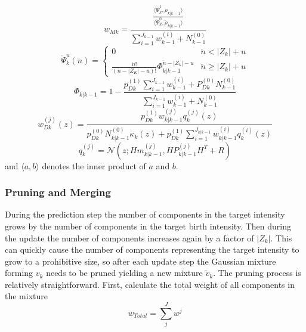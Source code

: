 \documentclass{article}
\begin{document}
\begin{equation}
  \label{eq:wmk}
  w_{Mk} = \frac{\frac{\langle\ddot{\Psi}_k^1,\ddot{\rho}_{k|k-1}\rangle}{\langle\ddot{\Psi}_k^0,\ddot{\rho}_{k|k-1}\rangle}}{\sum_{i=1}^{J_{k-1}}w_{k-1}^{(i)} + N_{k-1}^{(0)}}
\end{equation}
\begin{equation}
  \label{eq:psi}
  \ddot{\Psi}_k^u(\ddot{n}) =
  \begin{cases}
    0 & \ddot{n} < |Z_k| + u \\
   \frac{\ddot{n}!}{(\ddot{n}-|Z_K|-u)!}\Phi_{k|k-1}^{\ddot{n} - |Z_k|-u} & \ddot{n} \ge |Z_k|+u
  \end{cases}
\end{equation}
\begin{equation}
  \label{eq:Phi}
  \Phi_{k|k-1} = 1 - \frac{p_{Dk}^{(1)}\sum_{i=1}^{J_{k-1}}w_{k-1}^{(i)} + P_{Dk}^{(0)}N_{k-1}^{(0)}}{\sum_{i=1}^{J_{k-1}}w_{k-1}^{(i)} + N_{k-1}^{(0)}}
\end{equation}
\begin{equation}
  \label{eq:wD}
  w_{Dk}^{(j)}(z) = \frac{p_{Dk}^{(1)}w_{k|k-1}^{(j)}q_k^{(j)}(z)}{p_{Dk}^{(0)}N_{k|k-1}^{(0)}\kappa_k(z) +  p_{Dk}^{(1)}\sum_{i=1}^{J_{k|k-1}}w_{k|k-1}^{(i)}q_k^{(i)}(z)  }
\end{equation}
\begin{equation}
  \label{eq:qz}
  q_k^{(j)} = \mathcal{N}(z;Hm_{k|k-1}^{(j)}, HP_{k|k-1}^{(j)}H^T + R)
\end{equation}
and $\langle a, b \rangle$ denotes the inner product of $a$ and $b$.

\subsubsection*{Pruning and Merging}
During the prediction step the number of components in the target intensity grows by the number of components in the target birth intensity. Then during the update the number of components increases again by a factor of $|Z_k|$. This can quickly cause the number of components representing the target intensity to grow to a prohibitive size, so after each update step the Gaussian mixture forming $v_{k}$ needs to be pruned yielding a new mixture $\tilde{v}_k$. The pruning process is relatively straightforward. First, calculate the total weight of all components in the mixture
\begin{equation}
  \label{eq:wtotal}
  w_{Total} = \sum_j^Jw^j
\end{equation}
\end{document}
